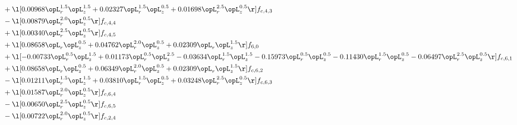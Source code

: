\begin{alignat}{2}
& + \l[  0.00968 \opL_r^{1.5} \opL_z^{1.5} +  0.02327 \opL_r^{1.5} \opL_z^{0.5} +  0.01698 \opL_r^{2.5} \opL_z^{0.5}  \r] f_{c,4,3} \nonumber \\ 
& - \l[  0.00879 \opL_r^{2.0} \opL_z^{0.5}  \r] f_{c,4,4} \nonumber \\ 
& + \l[  0.00340 \opL_r^{2.5} \opL_z^{0.5}  \r] f_{c,4,5} \nonumber \\ 
& + \l[  0.08658 \opL_r \opL_z^{0.5} +  0.04762 \opL_r^{2.0} \opL_z^{0.5} +  0.02309 \opL_r \opL_z^{1.5}  \r] f_{6,0} \nonumber \\ 
& + \l[  -0.00733 \opL_r^{0.5} \opL_z^{1.5} +  0.01173 \opL_r^{0.5} \opL_z^{2.5}   -0.03634 \opL_r^{1.5} \opL_z^{1.5}   -0.15973 \opL_r^{0.5} \opL_z^{0.5}   -0.11430 \opL_r^{1.5} \opL_z^{0.5}   -0.06497 \opL_r^{2.5} \opL_z^{0.5}  \r] f_{c,6,1} \nonumber \\ 
& + \l[  0.08658 \opL_r \opL_z^{0.5} +  0.06349 \opL_r^{2.0} \opL_z^{0.5} +  0.02309 \opL_r \opL_z^{1.5}  \r] f_{c,6,2} \nonumber \\ 
& - \l[  0.01211 \opL_r^{1.5} \opL_z^{1.5} +  0.03810 \opL_r^{1.5} \opL_z^{0.5} +  0.03248 \opL_r^{2.5} \opL_z^{0.5}  \r] f_{c,6,3} \nonumber \\ 
& + \l[  0.01587 \opL_r^{2.0} \opL_z^{0.5}  \r] f_{c,6,4} \nonumber \\ 
& - \l[  0.00650 \opL_r^{2.5} \opL_z^{0.5}  \r] f_{c,6,5} \nonumber \\ 
& - \l[  0.00722 \opL_r^{2.0} \opL_z^{0.5}  \r] f_{c,2,4} \nonumber \\ 
\end{alignat} 


